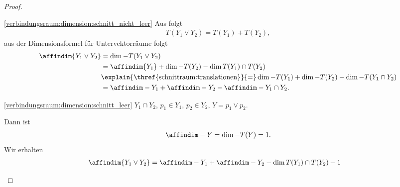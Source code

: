 \begin{proof}
    \begin{proofdescription}
        
        \item[\ref{verbindungsraum:dimension:schnitt_nicht_leer}] Aus  folgt
        \begin{align*}
            T(Y_1\vee Y_2)=T(Y_1)+T(Y_2),
        \end{align*}
        aus der Dimensionsformel für Untervektorräume folgt
        \begin{equation*}
            \affindim{Y_1\vee Y_2}\begin{aligned}[t] 
                &=\dim-{}{T(Y_1\vee Y_2)}\\
                &=\affindim{Y_1}+\dim-{}{T(Y_2)}-\dim{}{T(Y_1)\cap T(Y_2)}\\
                &\explain{\text{\thref{schnittraum:translationen}}}{=}\dim-{}{T(Y_1)}+\dim-{}{T(Y_2)}-\dim-{}{T(Y_1\cap Y_2)}\\
                &=\affindim-{Y_1}+\affindim-{Y_2}-\affindim-{Y_1\cap Y_2}.
            \end{aligned}
        \end{equation*}
        
        \item[\ref{verbindungsraum:dimension:schnitt_leer}] \( Y_1\cap Y_2 \), \( p_1\in Y_1 \), \( p_2\in Y_2 \), \( Y=p_1\vee p_2 \).
        
        Dann ist
        \begin{align*}
            \affindim-{Y}=\dim-{}{T(Y)}=1.
        \end{align*}
        Wir erhalten
        \begin{align*}
            \affindim{Y_1\vee Y_2}\begin{aligned}[t] 
                &=\affindim-{Y_1}+\affindim-{Y_2} -\dim{}{T(Y_1)\cap T(Y_2)}+1
            \end{aligned}
        \end{align*}
    \end{proofdescription}
\end{proof}
